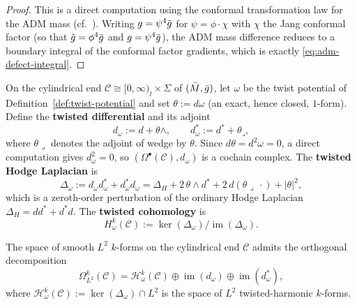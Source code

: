 \begin{proof}
This is a direct computation using the conformal transformation law for the ADM mass (cf.\ \cite{bartnik1986}). Writing $g = \psi^4 \bar{g}$ for $\psi = \phi \cdot \chi$ with $\chi$ the Jang conformal factor (so that $\tilde{g} = \phi^4 \bar{g}$ and $g = \psi^4 \bar{g}$), the ADM mass difference reduces to a boundary integral of the conformal factor gradients, which is exactly \eqref{eq:adm-defect-integral}.
\end{proof}

\begin{definition}\label{def:twisted-hodge}
On the cylindrical end $\mathcal{C} \cong [0, \infty)_t \times \Sigma$ of $(\bar{M}, \bar{g})$, let $\omega$ be the twist potential of Definition~\ref{def:twist-potential} and set $\theta := d\omega$ (an exact, hence closed, $1$-form). Define the \textbf{twisted differential} and its adjoint
\begin{equation}
d_{\omega} := d + \theta\wedge, \qquad d^*_{\omega} := d^* + \theta\mathbin{\lrcorner},
\end{equation}
where $\theta\mathbin{\lrcorner}$ denotes the adjoint of wedge by $\theta$. Since $d\theta = d^2\omega = 0$, a direct computation gives $d_{\omega}^2 = 0$, so $(\Omega^{\bullet}(\mathcal{C}), d_{\omega})$ is a cochain complex. The \textbf{twisted Hodge Laplacian} is
\begin{equation}
\Delta_{\omega} := d_{\omega} d^*_{\omega} + d^*_{\omega} d_{\omega} = \Delta_H + 2\,\theta\wedge d^* + 2\,d(\theta\mathbin{\lrcorner}\,\cdot) + |\theta|^2,
\end{equation}
which is a zeroth-order perturbation of the ordinary Hodge Laplacian $\Delta_H = dd^* + d^*d$. The \textbf{twisted cohomology} is
\begin{equation}
H^k_{\omega}(\mathcal{C}) := \ker(\Delta_{\omega}) / \operatorname{im}(\Delta_{\omega}).
\end{equation}
\end{definition}

\begin{lemma}\label{lem:twisted-hodge-decomp}
The space of smooth $L^2$ $k$-forms on the cylindrical end $\mathcal{C}$ admits the orthogonal decomposition
\begin{equation}\label{eq:twisted-hodge-decomp}
\Omega^k_{L^2}(\mathcal{C}) = \mathcal{H}^k_{\omega}(\mathcal{C}) \oplus \operatorname{im}(d_{\omega}) \oplus \operatorname{im}(d^*_{\omega}),
\end{equation}
where $\mathcal{H}^k_{\omega}(\mathcal{C}) := \ker(\Delta_{\omega}) \cap L^2$ is the space of $L^2$ twisted-harmonic $k$-forms.
\end{lemma}

